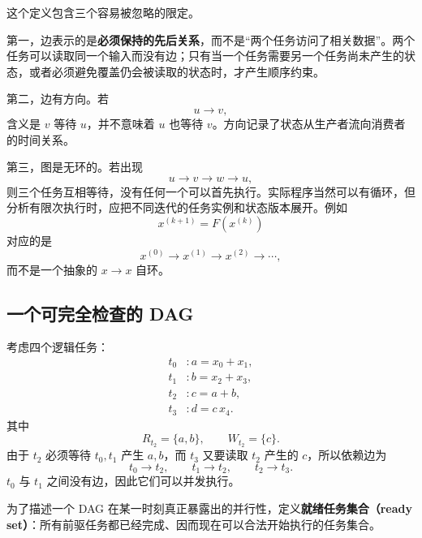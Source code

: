 这个定义包含三个容易被忽略的限定。

第一，边表示的是\textbf{必须保持的先后关系}，而不是“两个任务访问了相关数据”。两个任务可以读取同一个输入而没有边；只有当一个任务需要另一个任务尚未产生的状态，或者必须避免覆盖仍会被读取的状态时，才产生顺序约束。

第二，边有方向。若
\begin{equation}
u\rightarrow v,
\end{equation}
含义是 $v$ 等待 $u$，并不意味着 $u$ 也等待 $v$。方向记录了状态从生产者流向消费者的时间关系。

第三，图是无环的。若出现
\begin{equation}
u\rightarrow v\rightarrow w\rightarrow u,
\end{equation}
则三个任务互相等待，没有任何一个可以首先执行。实际程序当然可以有循环，但分析有限次执行时，应把不同迭代的任务实例和状态版本展开。例如
\begin{equation}
x^{(k+1)}=F(x^{(k)})
\end{equation}
对应的是
\begin{equation}
x^{(0)}
\rightarrow
x^{(1)}
\rightarrow
x^{(2)}
\rightarrow\cdots,
\end{equation}
而不是一个抽象的 $x\rightarrow x$ 自环。

\subsection{一个可完全检查的 DAG}

考虑四个逻辑任务：
\begin{align}
t_0 &: a=x_0+x_1,\\
t_1 &: b=x_2+x_3,\\
t_2 &: c=a+b,\\
t_3 &: d=c\,x_4.
\end{align}
其中
\begin{equation}
R_{t_2}=\{a,b\},
\qquad
W_{t_2}=\{c\}.
\end{equation}
由于 $t_2$ 必须等待 $t_0,t_1$ 产生 $a,b$，而 $t_3$ 又要读取 $t_2$ 产生的 $c$，所以依赖边为
\begin{equation}
t_0\rightarrow t_2,
\qquad
t_1\rightarrow t_2,
\qquad
t_2\rightarrow t_3.
\label{eq:parallel-small-dag}
\end{equation}
$t_0$ 与 $t_1$ 之间没有边，因此它们可以并发执行。

为了描述一个 DAG 在某一时刻真正暴露出的并行性，定义\textbf{就绪任务集合（ready set）}：所有前驱任务都已经完成、因而现在可以合法开始执行的任务集合。

